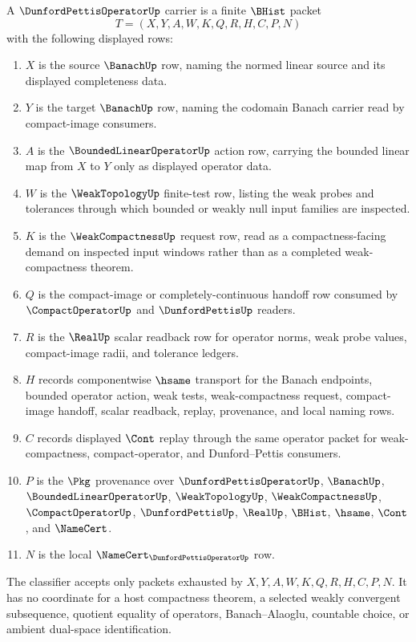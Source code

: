 \begin{definition}
\label{def:dunford-pettis-operator-carrier}
A $\DunfordPettisOperatorUp$ carrier is a finite $\BHist$ packet
$$
T=(X,Y,A,W,K,Q,R,H,C,P,N)
$$
with the following displayed rows:
\begin{enumerate}
\item $X$ is the source $\BanachUp$ row, naming the normed linear source and its displayed completeness data.
\item $Y$ is the target $\BanachUp$ row, naming the codomain Banach carrier read by compact-image consumers.
\item $A$ is the $\BoundedLinearOperatorUp$ action row, carrying the bounded linear map from $X$ to $Y$ only as displayed operator data.
\item $W$ is the $\WeakTopologyUp$ finite-test row, listing the weak probes and tolerances through which bounded or weakly null input families are inspected.
\item $K$ is the $\WeakCompactnessUp$ request row, read as a compactness-facing demand on inspected input windows rather than as a completed weak-compactness theorem.
\item $Q$ is the compact-image or completely-continuous handoff row consumed by $\CompactOperatorUp$ and $\DunfordPettisUp$ readers.
\item $R$ is the $\RealUp$ scalar readback row for operator norms, weak probe values, compact-image radii, and tolerance ledgers.
\item $H$ records componentwise $\hsame$ transport for the Banach endpoints, bounded operator action, weak tests, weak-compactness request, compact-image handoff, scalar readback, replay, provenance, and local naming rows.
\item $C$ records displayed $\Cont$ replay through the same operator packet for weak-compactness, compact-operator, and Dunford--Pettis consumers.
\item $P$ is the $\Pkg$ provenance over $\DunfordPettisOperatorUp$, $\BanachUp$, $\BoundedLinearOperatorUp$, $\WeakTopologyUp$, $\WeakCompactnessUp$, $\CompactOperatorUp$, $\DunfordPettisUp$, $\RealUp$, $\BHist$, $\hsame$, $\Cont$, and $\NameCert$.
\item $N$ is the local $\NameCert_{\DunfordPettisOperatorUp}$ row.
\end{enumerate}
The classifier accepts only packets exhausted by $X,Y,A,W,K,Q,R,H,C,P,N$. It has no coordinate for a host compactness theorem, a selected weakly convergent subsequence, quotient equality of operators, Banach--Alaoglu, countable choice, or ambient dual-space identification.
\end{definition}

